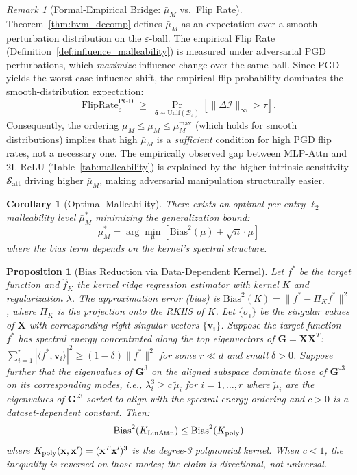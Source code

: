 \documentclass{article}
\theoremstyle{plain}
\newtheorem{proposition}[theorem]{Proposition}
\newtheorem{corollary}[theorem]{Corollary}
\theoremstyle{definition}
\theoremstyle{remark}
\newtheorem{remark}[theorem]{Remark}
\begin{document}
\begin{remark}[Formal-Empirical Bridge: $\bar{\mu}_M$ vs.\ Flip Rate]
\label{rmk:formal_empirical_bridge}
Theorem~\ref{thm:bvm_decomp} defines $\bar{\mu}_M$ as an expectation over a smooth perturbation distribution on the $\varepsilon$-ball. The empirical Flip Rate (Definition~\ref{def:influence_malleability}) is measured under adversarial PGD perturbations, which \emph{maximize} influence change over the same ball. Since PGD yields the worst-case influence shift, the empirical flip probability dominates the smooth-distribution expectation:
$$\mathrm{FlipRate}^{\mathrm{PGD}}_\varepsilon \;\geq\; \Pr_{\boldsymbol{\delta}\sim\mathrm{Unif}(\mathcal{B}_\varepsilon)}\!\left[\|\Delta\boldsymbol{\mathcal{I}}\|_\infty > \tau\right].$$
Consequently, the ordering $\mu_M \leq \bar{\mu}_M \leq \mu_M^{\max}$ (which holds for smooth distributions) implies that high $\bar{\mu}_M$ is a \emph{sufficient} condition for high PGD flip rates, not a necessary one. The empirically observed gap between MLP-Attn and 2L-ReLU (Table~\ref{tab:malleability}) is explained by the higher intrinsic sensitivity $\mathcal{S}_{\mathrm{att}}$ driving higher $\bar{\mu}_M$, making adversarial manipulation structurally easier.
\end{remark}

\begin{corollary}[Optimal Malleability]
There exists an optimal per-entry $\ell_2$ malleability level $\bar{\mu}_M^*$ minimizing the generalization bound:
$$\bar{\mu}_M^* = \arg\min_{\mu}\left[\mathrm{Bias}^2(\mu) + \sqrt{n}\cdot\mu\right]$$
where the bias term depends on the kernel's spectral structure.
\end{corollary}

\begin{proposition}[Bias Reduction via Data-Dependent Kernel]
\label{prop:bias_reduction}
Let $f^*$ be the target function and $\hat{f}_K$ the kernel ridge regression estimator with kernel $K$ and regularization $\lambda$. The approximation error (bias) is $\text{Bias}^2(K) = \|f^* - \Pi_K f^*\|^2$, where $\Pi_K$ is the projection onto the RKHS of $K$. Let $\{\sigma_i\}$ be the singular values of $\mathbf{X}$ with corresponding right singular vectors $\{\mathbf{v}_i\}$. Suppose the target function $f^*$ has spectral energy concentrated along the top eigenvectors of $\mathbf{G} = \mathbf{X}\mathbf{X}^T$: $\sum_{i=1}^{r} |\langle f^*, \mathbf{v}_i \rangle|^2 \geq (1-\delta)\|f^*\|^2$ for some $r \ll d$ and small $\delta > 0$. Suppose further that the eigenvalues of $\mathbf{G}^3$ on the aligned subspace dominate those of $\mathbf{G}^{\circ 3}$ on its corresponding modes, i.e., $\lambda_i^3 \geq c\,\tilde{\mu}_i$ for $i=1,\ldots,r$ where $\tilde{\mu}_i$ are the eigenvalues of $\mathbf{G}^{\circ 3}$ sorted to align with the spectral-energy ordering and $c>0$ is a dataset-dependent constant. Then:
$$\mathrm{Bias}^2(K_{\textup{LinAttn}}) \leq \mathrm{Bias}^2(K_{\textup{poly}})$$
where $K_{\textup{poly}}(\mathbf{x}, \mathbf{x}') = (\mathbf{x}^T\mathbf{x}')^3$ is the degree-3 polynomial kernel. When $c < 1$, the inequality is reversed on those modes; the claim is directional, not universal.
\end{proposition}
\end{document}
